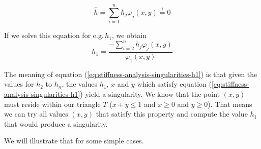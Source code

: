 \documentclass{article}
\renewcommand{\phi}{\varphi}
\begin{document}
\begin{equation*}
  \widehat{h} = \sum_{i=1}^n h_j \phi_j(x,y) \stackrel{!}{=} 0
\end{equation*}

If we solve this equation for e.g.\,$h_1$, we obtain
\begin{equation}
  \label{eq:stiffness-analysis-singularities-h1}
  h_1 = \frac{-\sum_{i=2}^n h_j \phi_j(x,y)}{\phi_1(x,y)}
\end{equation}

The meaning of equation (\ref{eq:stiffness-analysis-singularities-h1}) is that given the values for $h_2$ to $h_n$, the values $h_1$, $x$ and $y$ which satisfy equation (\ref{eq:stiffness-analysis-singularities-h1}) yield a singularity. We know that the point $(x,y)$ must reside within our triangle $T$ ($x+y\leq 1$ and $x\geq 0$ and $y\geq 0$). That means we can try all values $(x,y)$ that satisfy this property and compute the value $h_1$ that would produce a singularity.

We will illustrate that for some simple cases.
\end{document}
